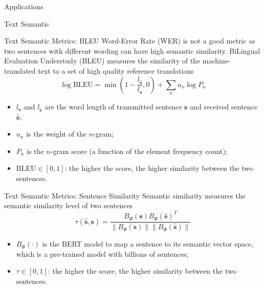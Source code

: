 \documentclass[presentation,mathserif,9pt]{beamer}
\begin{document}
\begin{section}{Applications}
	\begin{subsection}{Text Semantic}
		\begin{frame}{Text Semantic Metrics: BLEU}
			Word-Error Rate (WER) is not a good metric as two sentences with different wording can have high semantic similarity.
			\singlespacing
			BiLingual Evaluation Understudy (BLEU) \cite{Papineni2002} measures the similarity of the machine-translated text to a set of high quality reference translations
			\begin{equation}
				\log \text{BLEU} = \min (1 - \frac{l_{\hat{\boldsymbol{s}}}}{l_{\boldsymbol{s}}},0) + \sum_{n} u_n \log P_n
			\end{equation}
			\vspace{-0.3cm}
			\begin{itemize}
				\item $l_{\boldsymbol{s}}$ and $l_{\hat{\boldsymbol{s}}}$ are the word length of transmitted sentence $\boldsymbol{s}$ and received sentence $\hat{\boldsymbol{s}}$;
				\item $u_n$ is the weight of the $n$-gram;
				\item $P_n$ is the $n$-gram score (a function of the element frequency count);
				\item $\text{BLEU} \in [0,1]$: the higher the score, the higher similarity between the two sentences.
			\end{itemize}
		\end{frame}

		\begin{frame}{Text Semantic Metrics: Sentence Similarity}
			Semantic similarity \cite{Xie2021a} measures the semantic similarity level of two sentences
			\begin{equation}
				\tau(\hat{\boldsymbol{s}},\boldsymbol{s}) = \frac{B_{\Phi}(\boldsymbol{s}) B_{\Phi}(\hat{\boldsymbol{s}})^T}{\lVert B_{\Phi}(\boldsymbol{s}) \rVert \lVert B_{\Phi}(\hat{\boldsymbol{s}}) \rVert}
			\end{equation}
			\vspace{-0.3cm}
			\begin{itemize}
				\item $B_{\Phi}(\cdot)$ is the BERT model to map a sentence to its semantic vector space, which is a pre-trained model with billions of sentences;
				\item $\tau \in [0,1]$: the higher the score, the higher similarity between the two sentences.
			\end{itemize}
		\end{frame}


\end{subsection}
\end{section}
\end{document}
